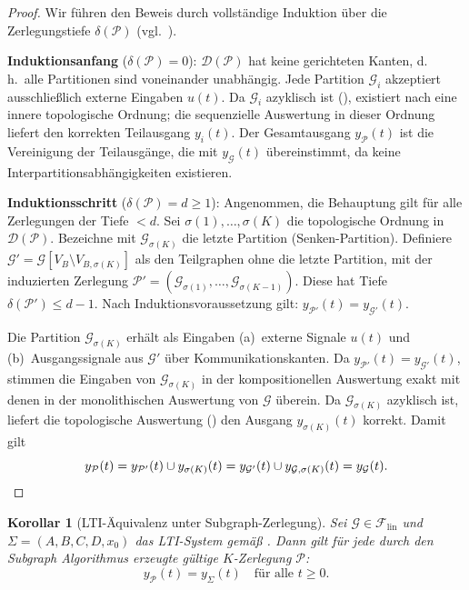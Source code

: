 ﻿\documentclass[12pt,a4paper]{article}
\newtheorem{korollar}[theorem]{Korollar}
\theoremstyle{definition}
\begin{document}
\begin{proof}
Wir führen den Beweis durch vollständige Induktion über die Zerlegungstiefe
$\delta(\mathcal{P})$ (vgl.\ ).

\medskip
\textbf{Induktionsanfang} ($\delta(\mathcal{P}) = 0$):
$\mathcal{D}(\mathcal{P})$ hat keine gerichteten Kanten, d.\,h.\ alle
Partitionen sind voneinander unabhängig. Jede Partition $\mathcal{G}_i$
akzeptiert ausschließlich externe Eingaben $u(t)$. Da $\mathcal{G}_i$
azyklisch ist (), existiert nach  eine
innere topologische Ordnung; die sequenzielle Auswertung in dieser
Ordnung liefert den korrekten Teilausgang $y_i(t)$. Der Gesamtausgang
$y_{\mathcal{P}}(t)$ ist die Vereinigung der Teilausgänge, die mit
$y_{\mathcal{G}}(t)$ übereinstimmt, da keine Interpartitionsabhängigkeiten
existieren.

\medskip
\textbf{Induktionsschritt} ($\delta(\mathcal{P}) = d \geq 1$):
Angenommen, die Behauptung gilt für alle Zerlegungen der Tiefe $< d$.
Sei $\sigma(1), \ldots, \sigma(K)$ die topologische Ordnung in
$\mathcal{D}(\mathcal{P})$. Bezeichne mit $\mathcal{G}_{\sigma(K)}$ die
letzte Partition (Senken-Partition). Definiere
$\mathcal{G}' = \mathcal{G}[V_B \setminus V_{B,\sigma(K)}]$ als den
Teilgraphen ohne die letzte Partition, mit der induzierten Zerlegung
$\mathcal{P}' = (\mathcal{G}_{\sigma(1)}, \ldots, \mathcal{G}_{\sigma(K-1)})$.
Diese hat Tiefe $\delta(\mathcal{P}') \leq d - 1$.
Nach Induktionsvoraussetzung gilt: $y_{\mathcal{P}'}(t) = y_{\mathcal{G}'}(t)$.

Die Partition $\mathcal{G}_{\sigma(K)}$ erhält als Eingaben
(a)~externe Signale $u(t)$ und
(b)~Ausgangssignale aus $\mathcal{G}'$ über Kommunikationskanten.
Da $y_{\mathcal{P}'}(t) = y_{\mathcal{G}'}(t)$, stimmen die Eingaben von
$\mathcal{G}_{\sigma(K)}$ in der kompositionellen Auswertung exakt mit
denen in der monolithischen Auswertung von $\mathcal{G}$ überein.
Da $\mathcal{G}_{\sigma(K)}$ azyklisch ist, liefert die topologische
Auswertung () den Ausgang $y_{\sigma(K)}(t)$ korrekt.
Damit gilt
\[
  y_{\mathcal{P}}(t)
  = y_{\mathcal{P}'}(t) \cup y_{\sigma(K)}(t)
  = y_{\mathcal{G}'}(t) \cup y_{\mathcal{G},\sigma(K)}(t)
  = y_{\mathcal{G}}(t). \qedhere
\]
\end{proof}

\begin{korollar}[LTI-Äquivalenz unter Subgraph-Zerlegung]
\label{kor:lti-subgraph}
Sei $\mathcal{G} \in \mathcal{F}_{\mathrm{lin}}$ und
$\Sigma = (A, B, C, D, x_0)$ das LTI-System gemäß .
Dann gilt für jede durch den Subgraph Algorithmus erzeugte gültige
$K$-Zerlegung $\mathcal{P}$:
\[
  y_{\mathcal{P}}(t) = y_{\Sigma}(t) \quad \text{für alle } t \geq 0.
\]
\end{korollar}
\end{document}
